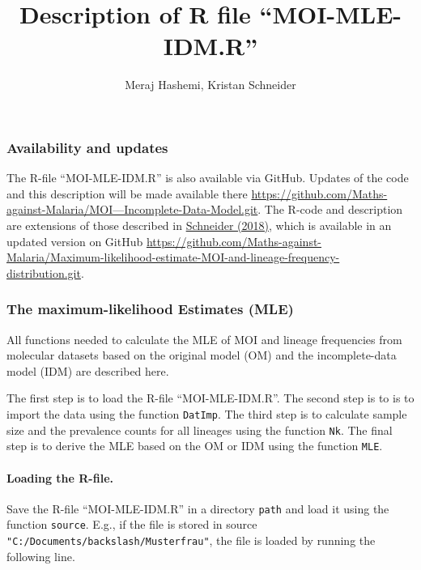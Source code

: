 \documentclass[
]{article}
\title{Description of R file ``MOI-MLE-IDM.R''}
\author{Meraj Hashemi, Kristan Schneider}
\date{}
\begin{document}
\maketitle

\hypertarget{availability-and-updates}{%
\subsubsection{Availability and
updates}\label{availability-and-updates}}

The R-file ``MOI-MLE-IDM.R'' is also available via GitHub. Updates of
the code and this description will be made available there
\href{https://github.com/Maths-against-Malaria/MOI---Incomplete-Data-Model.git}{https://github.com/Maths-against-Malaria/MOI---Incomplete-Data-Model.git}.
The R-code and description are extensions of those described in
\href{https://doi.org/10.1371/journal.pone.0194148}{Schneider (2018)},
which is available in an updated version on GitHub
\url{https://github.com/Maths-against-Malaria/Maximum-likelihood-estimate-MOI-and-lineage-frequency-distribution.git}.

\hypertarget{the-maximum-likelihood-estimates-mle}{%
\subsubsection{The maximum-likelihood Estimates
(MLE)}\label{the-maximum-likelihood-estimates-mle}}

All functions needed to calculate the MLE of MOI and lineage frequencies
from molecular datasets based on the original model (OM) and the
incomplete-data model (IDM) are described here.

The first step is to load the R-file ``MOI-MLE-IDM.R''. The second step
is to is to import the data using the function \texttt{DatImp}. The
third step is to calculate sample size and the prevalence counts for all
lineages using the function \texttt{Nk}. The final step is to derive the
MLE based on the OM or IDM using the function \texttt{MLE}.

\hypertarget{loading-the-r-file.}{%
\paragraph{Loading the R-file.}\label{loading-the-r-file.}}

Save the R-file ``MOI-MLE-IDM.R'' in a directory \texttt{path} and load
it using the function \texttt{source}. E.g., if the file is stored in
source \texttt{"C:/Documents/backslash/Musterfrau"}, the file is loaded
by running the following line.
\end{document}
